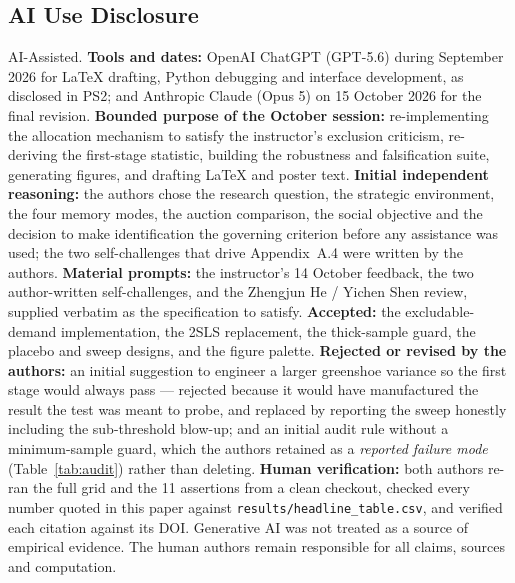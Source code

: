 \subsection{AI Use Disclosure}
AI-Assisted. \textbf{Tools and dates:} OpenAI ChatGPT (GPT-5.6) during September 2026 for LaTeX drafting, Python debugging and interface development, as disclosed in PS2; and Anthropic Claude (Opus 5) on 15 October 2026 for the final revision. \textbf{Bounded purpose of the October session:} re-implementing the allocation mechanism to satisfy the instructor's exclusion criticism, re-deriving the first-stage statistic, building the robustness and falsification suite, generating figures, and drafting LaTeX and poster text. \textbf{Initial independent reasoning:} the authors chose the research question, the strategic environment, the four memory modes, the auction comparison, the social objective and the decision to make identification the governing criterion before any assistance was used; the two self-challenges that drive Appendix~A.4 were written by the authors. \textbf{Material prompts:} the instructor's 14 October feedback, the two author-written self-challenges, and the Zhengjun He / Yichen Shen review, supplied verbatim as the specification to satisfy. \textbf{Accepted:} the excludable-demand implementation, the 2SLS replacement, the thick-sample guard, the placebo and sweep designs, and the figure palette. \textbf{Rejected or revised by the authors:} an initial suggestion to engineer a larger greenshoe variance so the first stage would always pass --- rejected because it would have manufactured the result the test was meant to probe, and replaced by reporting the sweep honestly including the sub-threshold blow-up; and an initial audit rule without a minimum-sample guard, which the authors retained as a \emph{reported failure mode} (Table~\ref{tab:audit}) rather than deleting. \textbf{Human verification:} both authors re-ran the full grid and the 11 assertions from a clean checkout, checked every number quoted in this paper against \texttt{results/headline\_table.csv}, and verified each citation against its DOI. Generative AI was not treated as a source of empirical evidence. The human authors remain responsible for all claims, sources and computation.

